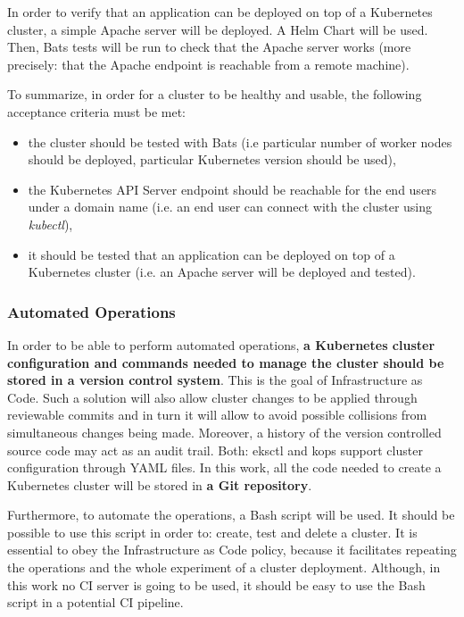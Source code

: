 In order to verify that an application can be deployed on top of a Kubernetes cluster, a simple Apache server will be deployed. A Helm Chart will be used\cite{helm-apache}. Then, Bats tests will be run to check that the Apache server works (more precisely: that the Apache endpoint is reachable from a remote machine).

To summarize, in order for a cluster to be healthy and usable, the following acceptance criteria must be met:
\begin{itemize}
\item the cluster should be tested with Bats (i.e particular number of worker nodes should be deployed, particular Kubernetes version should be used),
\item the Kubernetes API Server endpoint should be reachable for the end users under a domain name (i.e. an end user can connect with the cluster using \textit{kubectl}),
\item it should be tested that an application can be deployed on top of a Kubernetes cluster (i.e. an Apache server will be deployed and tested).
\end{itemize}

\subsubsection{Automated Operations}

In order to be able to perform automated operations, \textbf{a Kubernetes cluster configuration and commands needed to manage the cluster should be stored in a version control system}. This is the goal of Infrastructure as Code. Such a solution will also allow cluster changes to be applied through reviewable commits and in turn it will allow to avoid possible collisions from simultaneous changes being made. Moreover, a history of the version controlled source code may act as an audit trail\cite{online-kops-ci}. Both: eksctl and kops support cluster configuration through YAML files. In this work, all the code needed to create a Kubernetes cluster will be stored in \textbf{a Git repository}.

Furthermore, to automate the operations, a Bash script will be used. It should be possible to use this script in order to: create, test and delete a cluster. It is essential to obey the Infrastructure as Code policy, because it facilitates repeating the operations and the whole experiment of a cluster deployment. Although, in this work no CI server is going to be used, it should be easy to use the Bash script in a potential CI pipeline.


